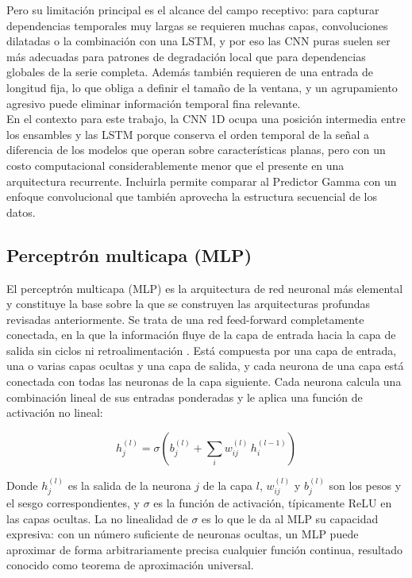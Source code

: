 Pero su limitación principal es el alcance del campo receptivo: para capturar dependencias temporales muy largas se requieren muchas capas, convoluciones dilatadas o la combinación con una LSTM, y por eso las CNN puras suelen ser más adecuadas para patrones de degradación local que para dependencias globales de la serie completa. Además también requieren de una entrada de longitud fija, lo que obliga a definir el tamaño de la ventana, y un agrupamiento agresivo puede eliminar información temporal fina relevante.\\[.15cm]

En el contexto para este trabajo, la CNN 1D ocupa una posición intermedia entre los ensambles y las LSTM porque conserva el orden temporal de la señal a diferencia de los modelos que operan sobre características planas, pero con un costo computacional considerablemente menor que el presente en una arquitectura recurrente. Incluirla permite comparar al Predictor Gamma con un enfoque convolucional que también aprovecha la estructura secuencial de los datos.

\subsection{Perceptrón multicapa (MLP)}

El perceptrón multicapa (MLP) es la arquitectura de red neuronal más elemental y constituye la base sobre la que se construyen las arquitecturas profundas revisadas anteriormente. Se trata de una red feed-forward completamente conectada, en la que la información fluye de la capa de entrada hacia la capa de salida sin ciclos ni retroalimentación \cite{goodfellow2016}. Está compuesta por una capa de entrada, una o varias capas ocultas y una capa de salida, y cada neurona de una capa está conectada con todas las neuronas de la capa siguiente. Cada neurona calcula una combinación lineal de sus entradas ponderadas y le aplica una función de activación no lineal:

\[
h_j^{(l)} = \sigma\left( b_j^{(l)} + \sum_{i} w_{ij}^{(l)}\, h_i^{(l-1)} \right)
\]

Donde $h_j^{(l)}$ es la salida de la neurona $j$ de la capa $l$, $w_{ij}^{(l)}$ y $b_j^{(l)}$ son los pesos y el sesgo correspondientes, y $\sigma$ es la función de activación, típicamente ReLU en las capas ocultas. La no linealidad de $\sigma$ es lo que le da al MLP su capacidad expresiva: con un número suficiente de neuronas ocultas, un MLP puede aproximar de forma arbitrariamente precisa cualquier función continua, resultado conocido como teorema de aproximación universal.\\[.15cm]

